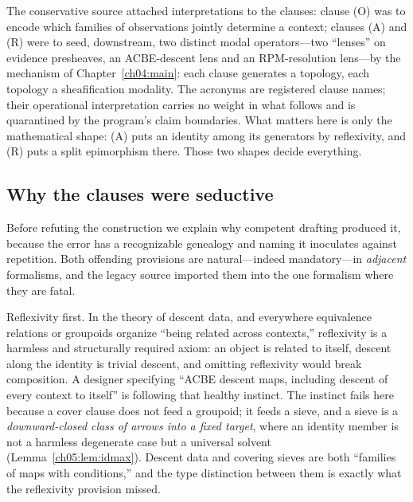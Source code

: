 \begin{remark}\label{ch05:rem:intent}
The conservative source attached interpretations to the clauses: clause (O)
was to encode which families of observations jointly determine a context;
clauses (A) and (R) were to seed, downstream, two distinct modal
operators---two ``lenses'' on evidence presheaves, an ACBE-descent lens and
an RPM-resolution lens---by the mechanism of Chapter~\ref{ch04:main}: each
clause generates a topology, each topology a sheafification modality. The
acronyms are registered clause names; their operational interpretation
carries no weight in what follows and is quarantined by the program's claim
boundaries. What matters here is only the mathematical shape: (A) puts an
identity among its generators by reflexivity, and (R) puts a split
epimorphism there. Those two shapes decide everything.
\end{remark}

\subsection{Why the clauses were seductive}\label{ch05:sub:seductive}

Before refuting the construction we explain why competent
drafting produced it, because the error has a recognizable genealogy and
naming it inoculates against repetition. Both offending provisions are
natural---indeed mandatory---in \emph{adjacent} formalisms, and the legacy
source imported them into the one formalism where they are fatal.

Reflexivity first. In the theory of descent data, and everywhere equivalence
relations or groupoids organize ``being related across contexts,''
reflexivity is a harmless and structurally required axiom: an object is
related to itself, descent along the identity is trivial descent, and
omitting reflexivity would break composition. A designer specifying
``ACBE descent maps, including descent of every context to itself'' is
following that healthy instinct. The instinct fails here because a cover
clause does not feed a groupoid; it feeds a sieve, and a sieve is a
\emph{downward-closed class of arrows into a fixed target}, where an
identity member is not a harmless degenerate case but a universal solvent
(Lemma~\ref{ch05:lem:idmax}). Descent data and covering sieves are both
``families of maps with conditions,'' and the type distinction between them
is exactly what the reflexivity provision missed.

